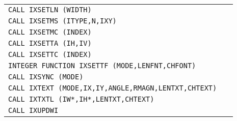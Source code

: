 \begin{longtable}{|>{\small\tt}p{.92\linewidth}r|}
CALL IXSETLN (WIDTH)                                  & \pageref{IXSETLN}\\
CALL IXSETMS (ITYPE,N,IXY)                            & \pageref{IXSETMS}\\
CALL IXSETMC (INDEX)                                  & \pageref{IXSETMC}\\
CALL IXSETTA (IH,IV)                                  & \pageref{IXSETTA}\\
CALL IXSETTC (INDEX)                                  & \pageref{IXSETTC}\\
INTEGER FUNCTION IXSETTF (MODE,LENFNT,CHFONT)         & \pageref{IXSETTF}\\
CALL IXSYNC (MODE)                                    & \pageref{IXSYNC} \\
CALL IXTEXT (MODE,IX,IY,ANGLE,RMAGN,LENTXT,CHTEXT)    & \pageref{IXTEXT} \\
CALL IXTXTL (IW*,IH*,LENTXT,CHTEXT)                   & \pageref{IXTXTL} \\
CALL IXUPDWI                                          & \pageref{IXUPDWI}\\
\hline
\end{longtable}
 
